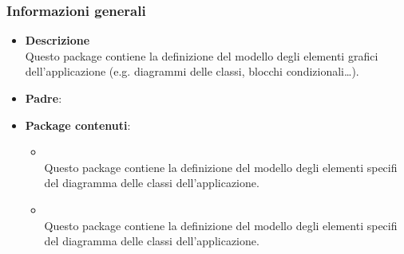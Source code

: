 \subsubsection{Informazioni generali}
\begin{itemize}
\item \textbf{Descrizione}\\
Questo package contiene la definizione del modello degli elementi grafici dell'applicazione (e.g. diagrammi delle classi, blocchi condizionali\dots). 
\item \textbf{Padre}: \hyperref[\nogloxy{swedesigner::client::model}]{}
\item \textbf{Package contenuti}:
\begin{itemize}
\item \hyperref[\nogloxy{swedesigner::client::model::celltypes::activity}]{}\\
Questo package contiene la definizione del modello degli elementi specifi del diagramma delle classi dell'applicazione.
\item \hyperref[\nogloxy{swedesigner::client::model::celltypes::class}]{}\\
Questo package contiene la definizione del modello degli elementi specifi del diagramma delle classi dell'applicazione.
\end{itemize}
\end{itemize}
